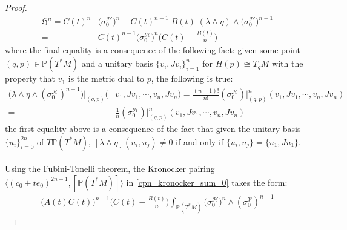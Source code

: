 \documentclass[11pt]{amsart}
\theoremstyle{plain}
\theoremstyle{definition}
\theoremstyle{remark}
\begin{document}
\begin{proof}
\begin{align}\label{CPn_zoll_poly_Hn_def}
     \mathfrak{H}^n = C(t)^n &\big(\sigma^{\mathcal{H}}_0\big)^{n} - C(t)^{n-1}\;B(t)\;(\lambda\wedge\eta) \wedge \big(\sigma^{\mathcal{H}}_0\big)^{n-1}  \\\nonumber = 
     &C(t)^{n-1} \big(\sigma^{\mathcal{H}}_0\big)^{n} \bigg(C(t) -\frac{B(t)}{n} \bigg)
\end{align}
where the final equality is a consequence of the following fact: given some point $(q,p) \in \mathbb{P}(T^* M)$ and a unitary basis $\{v_i, Jv_i\}^{n}_{i=1}$ for $H(p) \cong T_qM$ with the property that $v_1$ is the metric dual to $p$, the following is true: 
\begin{align}
    \big(\lambda \wedge \eta \wedge (\sigma^{\mathcal{H}}_{0})^{n-1}\big)|_{(q,p)}(&v_1,Jv_1,\cdots,v_n,Jv_n) = \frac{(n-1)!}{n!}(\sigma^{\mathcal{H}}_{0})|_{(q,p)}^n(v_1,Jv_1,\cdots,v_n,Jv_n) \\\nonumber = &\frac{1}{n}(\sigma^{\mathcal{H}}_{0})|_{(q,p)}^n(v_1,Jv_1,\cdots,v_n,Jv_n)
\end{align}
the first equality above is a consequence of the fact that given the unitary basis $\{u_i\}^{2n}_{i=0}$ of $ T\mathbb{P}(T^* M)$, $[\lambda \wedge \eta](u_i,u_j) \neq 0$ if and only if $\{u_i,u_j\} = \{u_1, Ju_1\}$.\\
\\
Using the Fubini-Tonelli theorem, the Kronocker pairing $\langle (c_0+te_0)^{2n-1},[\mathbb{P}(T^*M)]\rangle$ in \eqref{cpn_kronocker_sum_0} takes the form:
\begin{align}\label{cpn_second_last_int}
  \big(A(t)C(t)\big)^{n-1}\bigg(C(t) -\frac{B(t)}{n} \bigg)  \int_{\mathbb{P}(T^*M)} (\sigma^{\mathcal{H}}_{0}\big)^n \wedge (\sigma^{\mathcal{V}}_{0})^{n-1}
\end{align}


\end{proof}
\end{document}
